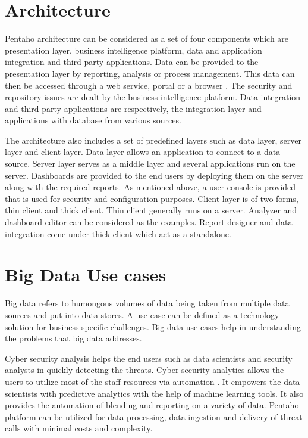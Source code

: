 \documentclass[9pt,twocolumn,twoside]{../../styles/osajnl}
\begin{document}
\section{Architecture}

Pentaho architecture can be considered as a set of four components
which are presentation layer, business intelligence platform, data and
application integration and third party applications. Data can be
provided to the presentation layer by reporting, analysis or process
management. This data can then be accessed through a web service,
portal or a browser \cite{pent7}. The security and repository issues
are dealt by the business intelligence platform. Data integration and
third party applications are respectively, the integration layer and
applications with database from various sources.

The architecture also includes a set of predefined layers such as data
layer, server layer and client layer. Data layer allows an application
to connect to a data source. Server layer serves as a middle layer and
several applications run on the server. Dashboards are provided to the
end users by deploying them on the server along with the required
reports. As mentioned above, a user console is provided that is used
for security and configuration purposes. Client layer is of two forms,
thin client and thick client. Thin client generally runs on a
server. Analyzer and dashboard editor can be considered as the
examples. Report designer and data integration come under thick client
which act as a standalone.

\section{Big Data Use cases}

Big data refers to humongous volumes of data being taken from multiple
data sources and put into data stores. A use case can be defined as a
technology solution for business specific challenges. Big data use
cases help in understanding the problems that big data addresses.

Cyber security analysis helps the end users such as data scientists
and security analysts in quickly detecting the threats. Cyber security
analytics allows the users to utilize most of the staff resources via
automation \cite{pent8}. It empowers the data scientists with
predictive analytics with the help of machine learning tools. It also
provides the automation of blending and reporting on a variety of
data. Pentaho platform can be utilized for data processing, data
ingestion and delivery of threat calls with minimal costs and
complexity.
\end{document}
